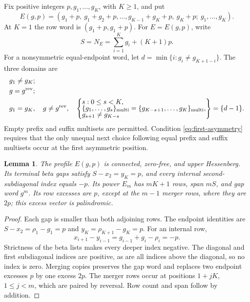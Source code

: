 \documentclass[11pt,a4paper]{amsart}
\numberwithin{equation}{section}
\theoremstyle{plain}
\newtheorem{lemma}[theorem]{Lemma}
\theoremstyle{definition}
\begin{document}
Fix positive integers \(p,g_1,\ldots,g_K\), with \(K\ge1\), and put
\begin{equation}\label{eq:constant-excess}
 E(g,p)=(g_1+p,\ g_1+g_2+p,\ldots,
 g_{K-1}+g_K+p,\ g_K+p;\ g_1,\ldots,g_K).
\end{equation}
At \(K=1\) the row word is \((g_1+p,g_1+p)\).
For \(E=E(g,p)\), write
\[
 S=N_E=\sum_{i=1}^K g_i+(K+1)p.
\]
For a nonsymmetric equal-endpoint word, let
\(d=\min\{i:g_i\ne g_{K+1-i}\}\).
The three domains are
\begin{align}
 &g_1\ne g_K;\label{eq:unequal-ends}\\
 &g=g^{\mathrm{rev}};\label{eq:symmetric-word}\\
 &g_1=g_K,\quad g\ne g^{\mathrm{rev}},\quad
 \left\{\begin{array}{@{}l@{}}s:0\le s<K,\\[-1mm]
 \{g_1,\ldots,g_s\}_{\mathrm{multi}}
 =\{g_{K-s+1},\ldots,g_K\}_{\mathrm{multi}},\\[-1mm]
 g_{s+1}\ne g_{K-s}
 \end{array}\right\}=\{d-1\}.
 \label{eq:first-asymmetry}
\end{align}
Empty prefix and suffix multisets are permitted.  Condition
\eqref{eq:first-asymmetry} requires that the only unequal next choice
following equal prefix and suffix multisets occur at the first asymmetric
position.

\begin{lemma}\label{lem:balanced-geometry}
The profile \(E(g,p)\) is connected, zero-free, and upper Hessenberg.
Its terminal beta gaps satisfy
\(S-x_2=y_K=p\), and every internal second-subdiagonal index equals
\(-p\).  Its power \(E_m\) has \(mK+1\) rows, span \(mS\),
and gap word \(g^m\).  Its row excesses are \(p\), except at the
\(m-1\) merger rows, where they are \(2p\); this excess vector is
palindromic.
\end{lemma}

\begin{proof}
Each gap is smaller than both adjoining rows.  The endpoint identities
are \(S-x_2=\rho_1-g_1=p\) and
\(y_K=\rho_{K+1}-g_K=p\).  For an internal row,
\[
 x_{i+1}-y_{i-1}=g_{i-1}+g_i-\rho_i=-p.
\]
Strictness of the beta lists makes every deeper index negative.  The
diagonal and first subdiagonal indices are positive, as are all indices
above the diagonal, so no index is zero.  Merging copies preserves the
gap word and replaces two endpoint excesses \(p\) by one excess
\(2p\).  The merger rows occur at positions \(1+jK\),
\(1\le j<m\), which are paired by reversal.  Row count and span
follow by addition.
\end{proof}
\end{document}
